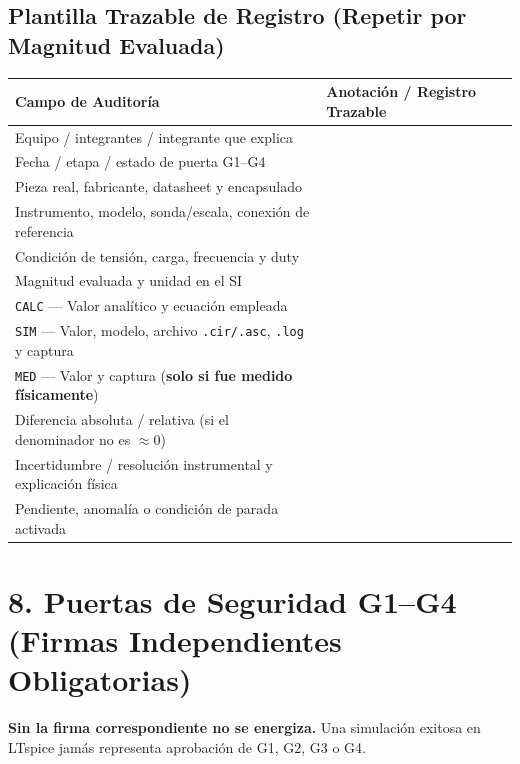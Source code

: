 \documentclass[10pt, a4paper, landscape]{article}
\begin{document}
\subsection*{Plantilla Trazable de Registro (Repetir por Magnitud Evaluada)}
\par\vspace{0.1cm}\noindent
\renewcommand{\arraystretch}{1.32}
\begin{tabularx}{\linewidth}{|p{6.5cm}|X|}
\hline
\rowcolor{ucbgray}
\textbf{Campo de Auditoría} & \textbf{Anotación / Registro Trazable} \\ \hline
Equipo / integrantes / integrante que explica & \\ \hline
Fecha / etapa / estado de puerta G1--G4 & \\ \hline
Pieza real, fabricante, datasheet y encapsulado & \\ \hline
Instrumento, modelo, sonda/escala, conexión de referencia & \\ \hline
Condición de tensión, carga, frecuencia y duty & \\ \hline
Magnitud evaluada y unidad en el SI & \\ \hline
\texttt{CALC} — Valor analítico y ecuación empleada & \\ \hline
\texttt{SIM} — Valor, modelo, archivo \texttt{.cir/.asc}, \texttt{.log} y captura & \\ \hline
\texttt{MED} — Valor y captura (\textbf{solo si fue medido físicamente}) & \\ \hline
Diferencia absoluta / relativa (si el denominador no es $\approx 0$) & \\ \hline
Incertidumbre / resolución instrumental y explicación física & \\ \hline
Pendiente, anomalía o condición de parada activada & \\ \hline
\end{tabularx}

\section*{8. Puertas de Seguridad G1--G4 (Firmas Independientes Obligatorias)}
\textbf{\textcolor{warnred}{Sin la firma correspondiente no se energiza.}} Una simulación exitosa en LTspice jamás representa aprobación de G1, G2, G3 o G4.
\end{document}
